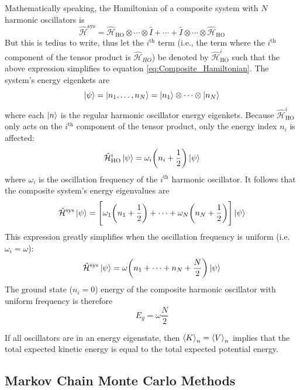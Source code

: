 \documentclass[nofootinbib,reprint,english]{revtex4-1}
\newcommand{\hatHH}{\hat{\mathcal{H}}}
\begin{document}
Mathematically speaking, the Hamiltonian of a composite system with \(N\) harmonic oscillators is
\begin{equation}
\hatHH^\text{sys}=\hatHH_\text{HO}\otimes\cdots\otimes\hat{I}+\cdots+\hat{I}\otimes\cdots\otimes\hatHH_\text{HO}
\end{equation}
But this is tedius to write, thus let the \(i^\text{th}\) term (i.e., the term where the \(i^\text{th}\) component of the tensor product is \(\hatHH_{HO}\)) be denoted by \(\hatHH_\text{HO}^i\) such that the above expression simplifies to equation \eqref{eq:Composite_Hamiltonian}. The system's energy eigenkets are
\begin{equation}\label{eq:composite_harmonic_oscillator_state}
\ket{\psi}=\ket{n_1,\ldots,n_N}=\ket{n_1}\otimes\cdots\otimes\ket{n_N}
\end{equation}
where each \(\ket{n}\) is the regular harmonic oscillator energy eigenkets. Because \(\hatHH_\text{HO}^i\) only acts on the \(i^\text{th}\) component of the tensor product, only the energy index \(n_i\) is affected:
\begin{equation}
\hatHH_\text{HO}^i\ket{\psi}=\omega_i\bigg(n_i+\frac{1}{2}\bigg)\ket{\psi}
\end{equation}
where \(\omega_i\) is the oscillation frequency of the \(i^\text{th}\) harmonic oscillator. It follows that the composite system's energy eigenvalues are
\begin{equation}\label{eq:composite_harmonic_oscillator_energy}
\hatHH^\text{sys}\ket{\psi}=\Bigg[\omega_1\bigg(n_1+\frac{1}{2}\bigg)+\cdots+\omega_N\bigg(n_N+\frac{1}{2}\bigg)\Bigg]\ket{\psi}
\end{equation}
This expression greatly simplifies when the oscillation frequency is uniform (i.e. \(\omega_i=\omega\)):
\begin{equation}\label{eq:composite_harmonic_oscillator_energy_unifreq}
\hatHH^\text{sys}\ket{\psi}=\omega\bigg(n_1+\cdots+n_N+\frac{N}{2}\bigg)\ket{\psi}
\end{equation}
The ground state (\(n_i=0\)) energy of the composite harmonic oscillator with uniform frequency is therefore
\begin{equation}\label{eq:composite_harmonic_oscillator_ground_energy}
E_g=\omega\frac{N}{2}
\end{equation}

If all oscillators are in an energy eigenstate, then \(\expval{K}_n=\expval{V}_n\) implies that the total expected kinetic energy is equal to the total expected potential energy.
\subsection{Markov Chain Monte Carlo Methods}
\end{document}
